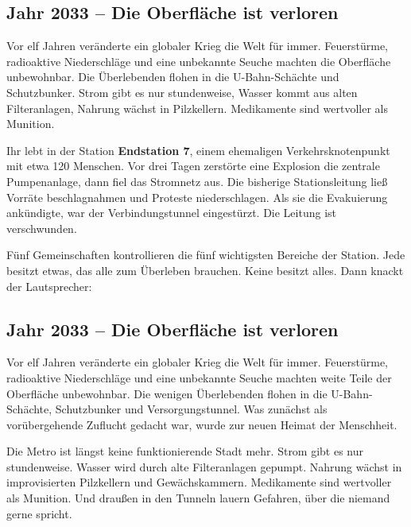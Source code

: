 \clearpage
\label{mat:start}

\ifkurz
\subsection*{Jahr 2033 -- Die Oberfläche ist verloren}
Vor elf Jahren veränderte ein globaler Krieg die Welt für immer. Feuerstürme, radioaktive Niederschläge und eine unbekannte Seuche machten die Oberfläche unbewohnbar. Die Überlebenden flohen in die U-Bahn-Schächte und Schutzbunker. Strom gibt es nur stundenweise, Wasser kommt aus alten Filteranlagen, Nahrung wächst in Pilzkellern. Medikamente sind wertvoller als Munition.

Ihr lebt in der Station \textbf{Endstation 7}, einem ehemaligen Verkehrsknotenpunkt mit etwa 120 Menschen. Vor drei Tagen zerstörte eine Explosion die zentrale Pumpenanlage, dann fiel das Stromnetz aus. Die bisherige Stationsleitung ließ Vorräte beschlagnahmen und Proteste niederschlagen. Als sie die Evakuierung ankündigte, war der Verbindungstunnel eingestürzt. Die Leitung ist verschwunden.

Fünf Gemeinschaften kontrollieren die fünf wichtigsten Bereiche der Station. Jede besitzt etwas, das alle zum Überleben brauchen. Keine besitzt alles. Dann knackt der Lautsprecher:
\else
\subsection*{Jahr 2033 -- Die Oberfläche ist verloren}
Vor elf Jahren veränderte ein globaler Krieg die Welt für immer. Feuerstürme, radioaktive Niederschläge und eine unbekannte Seuche machten weite Teile der Oberfläche unbewohnbar. Die wenigen Überlebenden flohen in die U-Bahn-Schächte, Schutzbunker und Versorgungstunnel. Was zunächst als vorübergehende Zuflucht gedacht war, wurde zur neuen Heimat der Menschheit.

Die Metro ist längst keine funktionierende Stadt mehr. Strom gibt es nur stundenweise. Wasser wird durch alte Filteranlagen gepumpt. Nahrung wächst in improvisierten Pilzkellern und Gewächskammern. Medikamente sind wertvoller als Munition. Und draußen in den Tunneln lauern Gefahren, über die niemand gerne spricht.

